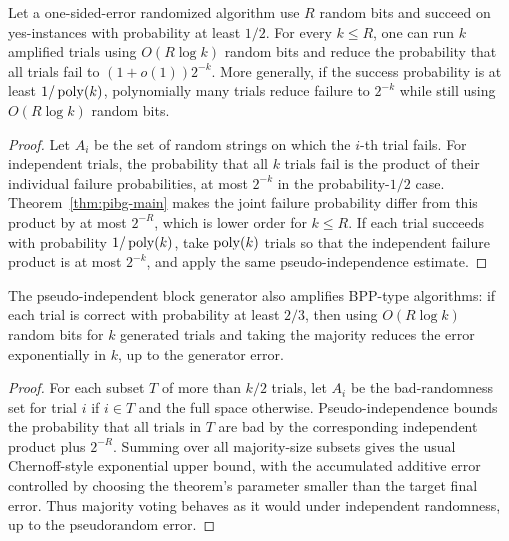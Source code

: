 \begin{corollary}
  \label{cor:deterministic-amplification}
  Let a one-sided-error randomized algorithm use $R$ random bits and succeed on
  yes-instances with probability at least $1/2$. For every $k\le R$, one can
  run $k$ amplified trials using $O(R\log k)$ random bits and reduce the
  probability that all trials fail to $(1+o(1))2^{-k}$. More generally, if the
  success probability is at least $1/\operatorname{poly}(k)$, polynomially many trials reduce
  failure to $2^{-k}$ while still using $O(R\log k)$ random bits.
\end{corollary}
\begin{proof}
  Let $A_i$ be the set of random strings on which the $i$-th trial fails. For
  independent trials, the probability that all $k$ trials fail is the product
  of their individual failure probabilities, at most $2^{-k}$ in the
  probability-$1/2$ case. Theorem~\ref{thm:pibg-main} makes the joint failure
  probability differ from this product by at most $2^{-R}$, which is lower
  order for $k\le R$. If each trial succeeds with probability
  $1/\operatorname{poly}(k)$, take $\operatorname{poly}(k)$ trials so that the independent failure product
  is at most $2^{-k}$, and apply the same pseudo-independence estimate.
\end{proof}

\begin{proposition}
  \label{prop:two-sided-amplification}
  The pseudo-independent block generator also amplifies BPP-type algorithms:
  if each trial is correct with probability at least $2/3$, then using
  $O(R\log k)$ random bits for $k$ generated trials and taking the majority
  reduces the error exponentially in $k$, up to the generator error.
\end{proposition}
\begin{proof}
  For each subset $T$ of more than $k/2$ trials, let $A_i$ be the bad-randomness
  set for trial $i$ if $i\in T$ and the full space otherwise. Pseudo-independence
  bounds the probability that all trials in $T$ are bad by the corresponding
  independent product plus $2^{-R}$. Summing over all majority-size subsets
  gives the usual Chernoff-style exponential upper bound, with the accumulated
  additive error controlled by choosing the theorem's parameter smaller than
  the target final error. Thus majority voting behaves as it would under
  independent randomness, up to the pseudorandom error.
\end{proof}

